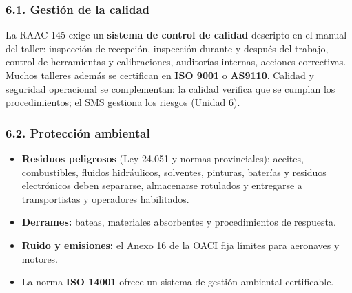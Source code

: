 \subsubsection*{6.1. Gestión de la calidad}
La RAAC 145 exige un \textbf{sistema de control de calidad} descripto en el manual del taller:
inspección de recepción, inspección durante y después del trabajo, control de herramientas y
calibraciones, auditorías internas, acciones correctivas. Muchos talleres además se certifican en
\textbf{ISO 9001} o \textbf{AS9110}. Calidad y seguridad operacional se complementan: la calidad
verifica que se cumplan los procedimientos; el SMS gestiona los riesgos (Unidad 6).

\subsubsection*{6.2. Protección ambiental}
\begin{itemize}
  \item \textbf{Residuos peligrosos} (Ley 24.051 y normas provinciales): aceites, combustibles,
        fluidos hidráulicos, solventes, pinturas, baterías y residuos electrónicos deben separarse,
        almacenarse rotulados y entregarse a transportistas y operadores habilitados.
  \item \textbf{Derrames:} bateas, materiales absorbentes y procedimientos de respuesta.
  \item \textbf{Ruido y emisiones:} el Anexo 16 de la OACI fija límites para aeronaves y
        motores.
  \item La norma \textbf{ISO 14001} ofrece un sistema de gestión ambiental certificable.
\end{itemize}

